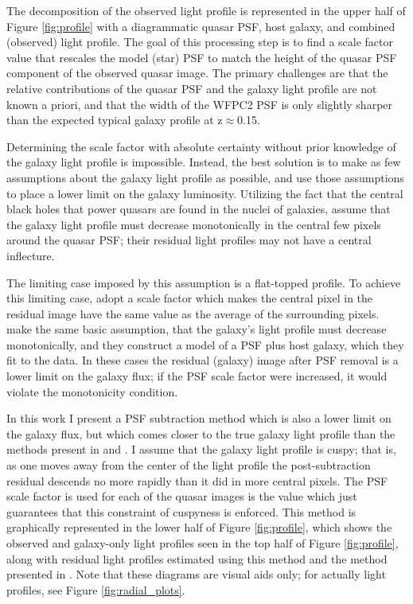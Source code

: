 The decomposition of the observed light profile is represented in the upper half of Figure \ref{fig:profile} with a diagrammatic quasar PSF, host galaxy, and combined (observed) light profile. The goal of this processing step is to find a scale factor value that rescales the model (star) PSF to match the height of the quasar PSF component of the observed quasar image.  The primary challenges are that the relative contributions of the quasar PSF and the galaxy light profile are not known a priori, and that the width of the WFPC2 PSF is only slightly sharper than the expected typical galaxy profile at z$\approx$0.15.

Determining the scale factor with absolute certainty without prior knowledge of the galaxy light profile is impossible. Instead, the best solution is to make as few assumptions about the galaxy light profile as possible, and use those assumptions to place a lower limit on the galaxy luminosity. Utilizing the fact that the central black holes that power quasars are found in the nuclei of galaxies, \cite{Bennert} assume that the galaxy light profile must decrease monotonically in the central few pixels around the quasar PSF; their residual light profiles may not have a central inflecture. 

The limiting case imposed by this assumption is a flat-topped profile. To achieve this limiting case, \cite{Bennert} adopt a scale factor which makes the central pixel in the residual image have the same value as the average of the surrounding pixels. \cite{McLeod} make the same basic assumption, that the galaxy's light profile must decrease monotonically, and they construct a model of a PSF plus host galaxy, which they fit to the data. In these cases the residual (galaxy) image after PSF removal is a lower limit on the galaxy flux; if the PSF scale factor were increased, it would violate the monotonicity condition.

In this work I present a PSF subtraction method which is also a lower limit on the galaxy flux, but which comes closer to the true galaxy light profile than the methods present in \cite{Bennert} and \cite{McLeod}. I assume that the galaxy light profile is cuspy; that is, as one moves away from the center of the light profile the post-subtraction residual descends no more rapidly than it did in more central pixels. The PSF scale factor is used for each of the quasar images is the value which just guarantees that this constraint of cuspyness is enforced. This method is graphically represented in the lower half of Figure \ref{fig:profile}, which shows the observed and galaxy-only light profiles seen in the top half of Figure \ref{fig:profile}, along with residual light profiles estimated using this method and the method presented in \cite{Bennert}.  Note that these diagrams are visual aids only; for actually light profiles, see Figure \ref{fig:radial_plots}.

